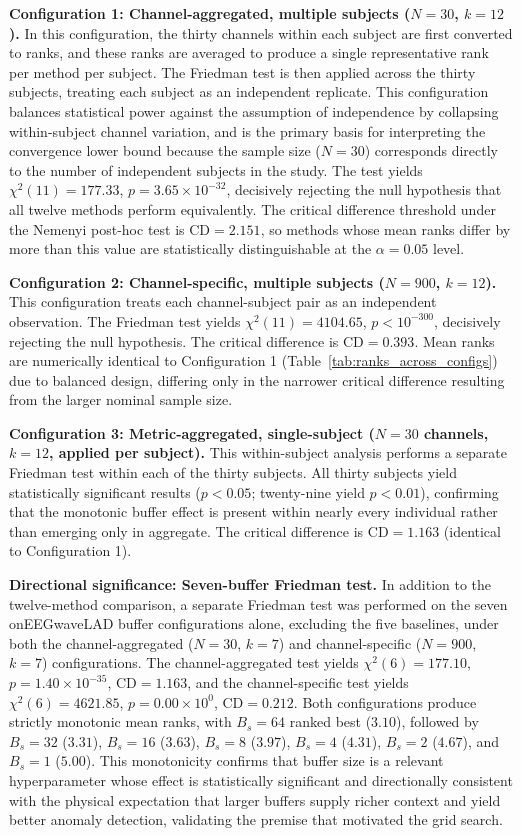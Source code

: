 \documentclass[MScCS,12pt,oneside,final]{uccthesis}
\begin{document}
\textbf{Configuration 1: Channel-aggregated, multiple subjects ($N = 30$, $k = 12$).} In this configuration, the thirty channels within each subject are first converted to ranks, and these ranks are averaged to produce a single representative rank per method per subject. The Friedman test is then applied across the thirty subjects, treating each subject as an independent replicate. This configuration balances statistical power against the assumption of independence by collapsing within-subject channel variation, and is the primary basis for interpreting the convergence lower bound because the sample size ($N = 30$) corresponds directly to the number of independent subjects in the study. The test yields $\chi^2(11) = 177.33$, $p = 3.65 \times 10^{-32}$, decisively rejecting the null hypothesis that all twelve methods perform equivalently. The critical difference threshold under the Nemenyi post-hoc test is $\mathrm{CD} = 2.151$, so methods whose mean ranks differ by more than this value are statistically distinguishable at the $\alpha = 0.05$ level.

\textbf{Configuration 2: Channel-specific, multiple subjects ($N = 900$, $k = 12$).} This configuration treats each channel-subject pair as an independent observation. The Friedman test yields $\chi^2(11) = 4104.65$, $p < 10^{-300}$, decisively rejecting the null hypothesis. The critical difference is $\mathrm{CD} = 0.393$. Mean ranks are numerically identical to Configuration 1 (Table~\ref{tab:ranks_across_configs}) due to balanced design, differing only in the narrower critical difference resulting from the larger nominal sample size.

\textbf{Configuration 3: Metric-aggregated, single-subject ($N = 30$ channels, $k = 12$, applied per subject).} This within-subject analysis performs a separate Friedman test within each of the thirty subjects. All thirty subjects yield statistically significant results ($p < 0.05$; twenty-nine yield $p < 0.01$), confirming that the monotonic buffer effect is present within nearly every individual rather than emerging only in aggregate. The critical difference is $\mathrm{CD} = 1.163$ (identical to Configuration 1).

\textbf{Directional significance: Seven-buffer Friedman test.} In addition to the twelve-method comparison, a separate Friedman test was performed on the seven onEEGwaveLAD buffer configurations alone, excluding the five baselines, under both the channel-aggregated ($N = 30$, $k = 7$) and channel-specific ($N = 900$, $k = 7$) configurations. The channel-aggregated test yields $\chi^2(6) = 177.10$, $p = 1.40 \times 10^{-35}$, $\mathrm{CD} = 1.163$, and the channel-specific test yields $\chi^2(6) = 4621.85$, $p = 0.00 \times 10^{0}$, $\mathrm{CD} = 0.212$. Both configurations produce strictly monotonic mean ranks, with $B_s = 64$ ranked best ($3.10$), followed by $B_s = 32$ ($3.31$), $B_s = 16$ ($3.63$), $B_s = 8$ ($3.97$), $B_s = 4$ ($4.31$), $B_s = 2$ ($4.67$), and $B_s = 1$ ($5.00$). This monotonicity confirms that buffer size is a relevant hyperparameter whose effect is statistically significant and directionally consistent with the physical expectation that larger buffers supply richer context and yield better anomaly detection, validating the premise that motivated the grid search.
\end{document}
